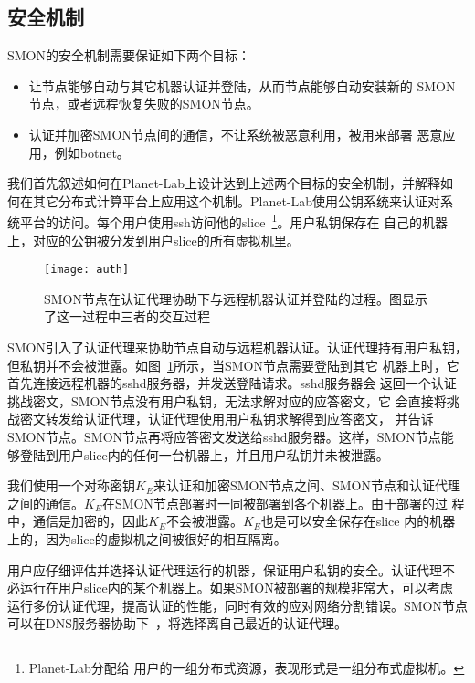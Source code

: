 \subsection{安全机制}
\label{subsec:security}

SMON的安全机制需要保证如下两个目标：

\begin{itemize}

  \item 让节点能够自动与其它机器认证并登陆，从而节点能够自动安装新的
  SMON节点，或者远程恢复失败的SMON节点。

  \item 认证并加密SMON节点间的通信，不让系统被恶意利用，被用来部署
  恶意应用，例如botnet。

\end{itemize}

我们首先叙述如何在Planet-Lab上设计达到上述两个目标的安全机制，并解释如
何在其它分布式计算平台上应用这个机制。Planet-Lab使用公钥系统来认证对系
统平台的访问。每个用户使用ssh访问他的slice~\footnote{Planet-Lab分配给
用户的一组分布式资源，表现形式是一组分布式虚拟机。}。用户私钥保存在
自己的机器上，对应的公钥被分发到用户slice的所有虚拟机里。

\begin{figure}[bthp]
\centering
  \begin{minipage}{0.8\linewidth}
    \centering
    \texttt{[image: auth]}
    \caption{SMON节点在认证代理协助下与远程机器认证并登陆的过程。图显示
    了这一过程中三者的交互过程}
    \label{fig:auth}
  \end{minipage}
\end{figure}

SMON引入了认证代理来协助节点自动与远程机器认证。认证代理持有用户私钥，
但私钥并不会被泄露。如图~\ref{fig:auth}所示，当SMON节点需要登陆到其它
机器上时，它首先连接远程机器的sshd服务器，并发送登陆请求。sshd服务器会
返回一个认证挑战密文，SMON节点没有用户私钥，无法求解对应的应答密文，它
会直接将挑战密文转发给认证代理，认证代理使用用户私钥求解得到应答密文，
并告诉SMON节点。SMON节点再将应答密文发送给sshd服务器。这样，SMON节点能
够登陆到用户slice内的任何一台机器上，并且用户私钥并未被泄露。

我们使用一个对称密钥$K_E$来认证和加密SMON节点之间、SMON节点和认证代理
之间的通信。$K_E$在SMON节点部署时一同被部署到各个机器上。由于部署的过
程中，通信是加密的，因此$K_E$不会被泄露。$K_E$也是可以安全保存在slice
内的机器上的，因为slice的虚拟机之间被很好的相互隔离。

用户应仔细评估并选择认证代理运行的机器，保证用户私钥的安全。认证代理不
必运行在用户slice内的某个机器上。如果SMON被部署的规模非常大，可以考虑
运行多份认证代理，提高认证的性能，同时有效的应对网络分割错误。SMON节点
可以在DNS服务器协助下~\cite{dns_akamai}，将选择离自己最近的认证代理。

